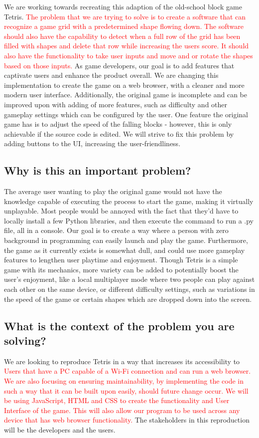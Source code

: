 \documentclass[11pt, oneside]{article}   	%
\begin{document}
\newcommand*\apos{\textsc{\char13}}
We are working towards recreating this adaption of the old-school block game Tetris. \textcolor{red}{The problem that we are trying to solve is to create a software that can recognize a game grid with a predetermined shape flowing down. The software should also have the capability to detect when a full row of the grid has been filled with shapes and delete that row while increasing the users score. It should also have the functionality to take user inputs and move and or rotate the shapes based on those inputs.} As game developers, our goal is to add features that captivate users and enhance the product overall. We are changing this implementation to create the game on a web browser, with a cleaner and more modern user interface. Additionally, the original game is incomplete and can be improved upon with adding of more features, such as difficulty and other gameplay settings which can be configured by the user. One feature the original game has is to adjust the speed of the falling blocks - however, this is only achievable if the source code is edited. We will strive to fix this problem by adding buttons to the UI, increasing the user-friendliness.
\subsection{Why is this an important problem?}

The average user wanting to play the original game would not have the knowledge capable of executing the process to start the game, making it virtually unplayable. Most people would be annoyed with the fact that they’d have to locally install a few Python libraries, and then execute the command to run a .py file, all in a console. Our goal is to create a way where a person with zero background in programming can easily launch and play the game. Furthermore, the game as it currently exists is somewhat dull, and could use more gameplay features to lengthen user playtime and enjoyment. Though Tetris is a simple game with its mechanics, more variety can be added to potentially boost the user’s enjoyment, like a local multiplayer mode where two people can play against each other on the same device, or different difficulty settings, such as variations in the speed of the game or certain shapes which are dropped down into the screen.

\subsection{What is the context of the problem you are solving?}

We are looking to reproduce Tetris in a way that increases its accessibility to \textcolor{red}{Users that have a PC capable of a Wi-Fi connection and can run a web browser. We are also focusing on ensuring maintainability, by implementing the code in such a way that it can be built upon easily, should future change occur. We will be using JavaScript, HTML and CSS to create the functionality and User Interface of the game. This will also allow our program to be used across any device that has web browser functionality.} The stakeholders in this reproduction will be the developers and the users. 
\end{document}
